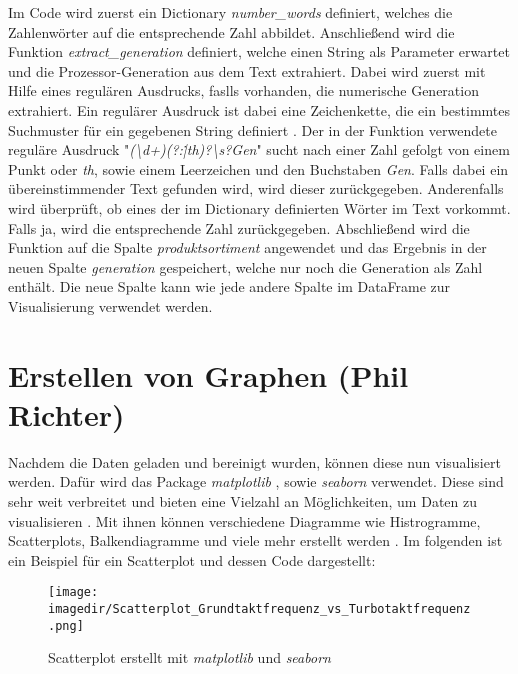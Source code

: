 Im Code wird zuerst ein Dictionary \cite{noauthor_5_nodate} \textit{number\_words} definiert, welches die Zahlenwörter auf die entsprechende Zahl abbildet.
Anschließend wird die Funktion \textit{extract\_generation} definiert, welche einen String als Parameter erwartet und die Prozessor-Generation aus dem Text extrahiert.
Dabei wird zuerst mit Hilfe eines regulären Ausdrucks, faslls vorhanden, die numerische Generation extrahiert. Ein regulärer Ausdruck ist dabei eine Zeichenkette,
die ein bestimmtes Suchmuster für ein gegebenen String definiert \cite{adegeo_regular_2022}.
Der in der Funktion verwendete reguläre Ausdruck "\textit{(\textbackslash d+)(?:\.|th)?\textbackslash s?Gen}" sucht nach einer Zahl gefolgt von einem Punkt oder \textit{th},
sowie einem Leerzeichen und den Buchstaben \textit{Gen}. Falls dabei ein übereinstimmender Text gefunden wird, wird dieser zurückgegeben. Anderenfalls wird
überprüft, ob eines der im Dictionary definierten Wörter im Text vorkommt. Falls ja, wird die entsprechende Zahl zurückgegeben.
Abschließend wird die Funktion auf die Spalte \textit{produktsortiment} angewendet und das Ergebnis in der neuen Spalte \textit{generation} gespeichert, welche nur noch die
Generation als Zahl enthält.
Die neue Spalte kann wie jede andere Spalte im DataFrame zur Visualisierung verwendet werden.

\section{Erstellen von Graphen (Phil Richter)}
Nachdem die Daten geladen und bereinigt wurden, können diese nun visualisiert werden. Dafür wird das Package \textit{matplotlib} \cite{noauthor_matplotlib_nodate},
sowie \textit{seaborn} \cite{waskom_seaborn_2021} verwendet. Diese sind sehr weit verbreitet und bieten eine Vielzahl an Möglichkeiten, um Daten zu visualisieren
\cite{noauthor_data_nodate}. Mit ihnen können verschiedene Diagramme wie Histrogramme, Scatterplots, Balkendiagramme und viele mehr erstellt werden \cite{noauthor_plot_nodate,
noauthor_example_nodate}. Im folgenden ist ein Beispiel für ein Scatterplot und dessen Code dargestellt:

\begin{figure}[H]
	\centering 
	\texttt{[image: \\imagedir/Scatterplot\_Grundtaktfrequenz\_vs\_Turbotaktfrequenz.png]} 
	\captionsetup{format=hang}
	\caption[Scatterplot]{\label{fig:scatterplot_Grundtaktfrequenz}Scatterplot erstellt mit \textit{matplotlib} und \textit{seaborn}}
\end{figure}


